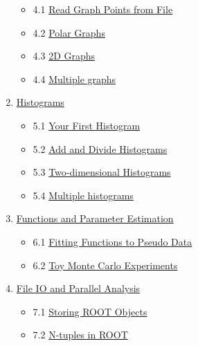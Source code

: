 \documentclass{article}
\providecommand{\tightlist}{%
      \setlength{\itemsep}{0pt}\setlength{\parskip}{0pt}}
\begin{document}
\begin{enumerate}
  \begin{itemize}
  \tightlist
  \item
    4.1 \href{/4-Graphs.html\#4.1-Read-Graph-Points-from-File}{Read
    Graph Points from File}
  \item
    4.2 \href{/4-Graphs.html\#4.2-Polar-Graphs}{Polar Graphs}
  \item
    4.3 \href{/4-Graphs.html\#4.3-2D-Graphs}{2D Graphs}
  \item
    4.4 \href{/4-Graphs.html\#4.4-Multiple-graphs}{Multiple graphs}
  \end{itemize}
\item
  \href{/5-Histograms.html}{Histograms}

  \begin{itemize}
  \tightlist
  \item
    5.1 \href{/5-Histograms.html\#5.1-Your-First-Histogram}{Your First
    Histogram}
  \item
    5.2 \href{/5-Histograms.html\#5.2-Add-and-Divide-Histograms}{Add and
    Divide Histograms}
  \item
    5.3
    \href{/5-Histograms.html\#5.3-Two-dimensional-Histograms}{Two-dimensional
    Histograms}
  \item
    5.4 \href{/5-Histograms.html\#5.4-Multiple-histograms}{Multiple
    histograms}
  \end{itemize}
\item
  \href{/6-Functions-and-Parameter-Estimation.html}{Functions and
  Parameter Estimation}

  \begin{itemize}
  \tightlist
  \item
    6.1
    \href{/6-Functions-and-Parameter-Estimation.html\#6.1-Fitting-Functions-to-Pseudo-Data}{Fitting
    Functions to Pseudo Data}
  \item
    6.2
    \href{/6-Functions-and-Parameter-Estimation.html\#6.2-Toy-Monte-Carlo-Experiments}{Toy
    Monte Carlo Experiments}
  \end{itemize}
\item
  \href{/7-File-IO-and-Parallel-Analysis.html}{File IO and Parallel
  Analysis}

  \begin{itemize}
  \tightlist
  \item
    7.1
    \href{/7-File-IO-and-Parallel-Analysis.html\#7.1-Storing-ROOT-Objects}{Storing
    ROOT Objects}
  \item
    7.2
    \href{/7-File-IO-and-Parallel-Analysis.html\#7.2-N-tuples-in-ROOT}{N-tuples
    in ROOT}


\end{itemize}
\end{enumerate}
\end{document}
